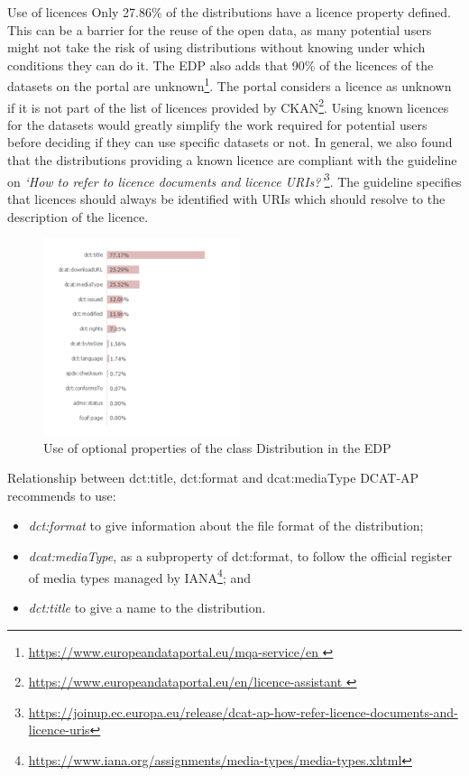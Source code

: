 \documentclass[<options>]{elsarticle}
\begin{document}
Use of licences
Only 27.86\% of the distributions have a licence property defined. This can be a barrier for the reuse of the open data, as many potential users might not take the risk of using distributions without knowing under which conditions they can do it. The EDP also adds that 90\% of the licences of the datasets on the portal are unknown\footnote{\href{    https://www.europeandataportal.eu/mqa-service/en}{ https://www.europeandataportal.eu/mqa-service/en }}. The portal considers a licence as unknown if it is not part of the list of licences provided by CKAN\footnote{\href{     https://www.europeandataportal.eu/en/licence-assistant}{ https://www.europeandataportal.eu/en/licence-assistant }}. Using known licences for the datasets would greatly simplify the work required for potential users before deciding if they can use specific datasets or not.
In general, we also found that the distributions providing a known licence are compliant with the guideline on \textit{‘How to refer to licence documents and licence URIs?’}\footnote{\href{https://joinup.ec.europa.eu/release/dcat-ap-how-refer-licence-documents-and-licence-uris}{  https://joinup.ec.europa.eu/release/dcat-ap-how-refer-licence-documents-and-licence-uris}}. The guideline specifies that licences should always be identified with URIs which should resolve to the description of the licence.

\begin{figure}[!h]
\includegraphics{replace25.png}
\caption{Use of optional properties of the class Distribution in the EDP}
\end{figure}

Relationship between dct:title, dct:format and dcat:mediaType
DCAT-AP recommends to use:

\begin{itemize}
\item \textit{dct:format} to give information about the file format of the distribution;
\item \textit{dcat:mediaType}, as a subproperty of dct:format, to follow the official register of media types managed by IANA\footnote{\href{ https://www.iana.org/assignments/media-types/media-types.xhtml}{   https://www.iana.org/assignments/media-types/media-types.xhtml}}; and
\item \textit{dct:title} to give a name to the distribution.
\end{itemize}
\end{document}
